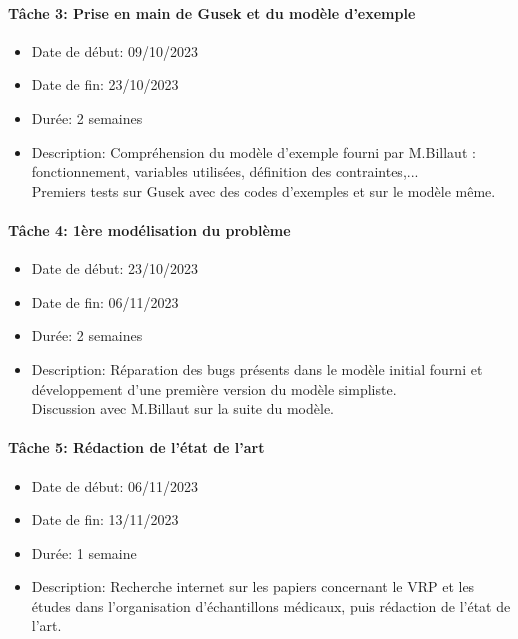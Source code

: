 \documentclass{polytech/polytech}
\numberwithin{figure}{chapter}
\begin{document}
\begin{appendix}
\paragraph{Tâche 3: Prise en main de Gusek et du modèle d'exemple}

\begin{itemize}
    \item Date de début: 09/10/2023
    \item Date de fin: 23/10/2023
    \item Durée: 2 semaines
    \item
        Description: Compréhension du modèle d'exemple fourni par M.Billaut : fonctionnement, variables utilisées, définition des contraintes,...\\
        Premiers tests sur Gusek avec des codes d'exemples et sur le modèle même.
        
\end{itemize}

\paragraph{Tâche 4: 1ère modélisation du problème}

\begin{itemize}
    \item Date de début: 23/10/2023
    \item Date de fin: 06/11/2023
    \item Durée: 2 semaines
    \item
        Description: Réparation des bugs présents dans le modèle initial fourni et développement d'une première version du modèle simpliste.\\
        Discussion avec M.Billaut sur la suite du modèle.
\end{itemize}

\paragraph{Tâche 5: Rédaction de l'état de l'art}

\begin{itemize}
    \item Date de début: 06/11/2023
    \item Date de fin: 13/11/2023
    \item Durée: 1 semaine
    \item
        Description: Recherche internet sur les papiers concernant le VRP et les études dans l'organisation d'échantillons médicaux, puis rédaction de l'état de l'art.
\end{itemize}


\end{appendix}
\end{document}
